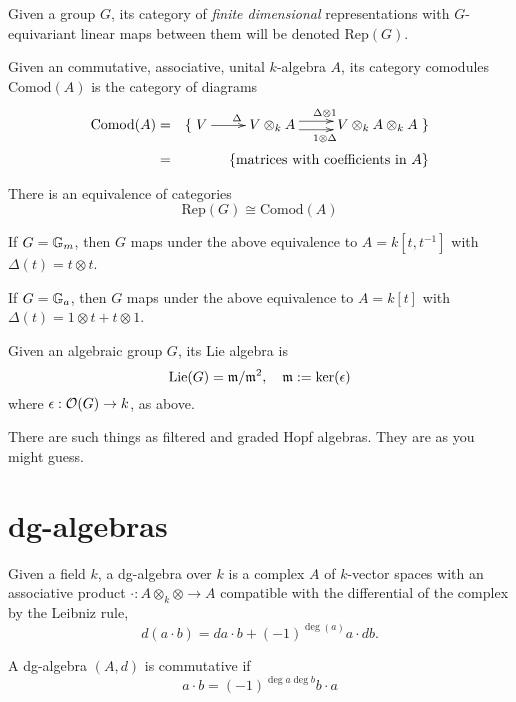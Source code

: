 \begin{defn}
Given a group $G$, its category of \emph{finite dimensional} representations with $G$-equivariant linear maps between them will be denoted $\mathrm{Rep}(G)$.
\end{defn}
\begin{defn}
Given an commutative, associative, unital $k$-algebra $A$, its category comodules $\mathrm{Comod}(A)$ is the category of diagrams
\begin{eqnarray*}
\mathrm{Comod}(A) & = & \{ \xymatrix{
V \ar[r]^{\Delta} & V \otimes_k A \ar@<0.3em>[r]^{\Delta \otimes 1} \ar@<-0.3em>[r]_{1 \otimes \Delta} & V \otimes_k A \otimes_k A
} \} \\
& = & \{ \textrm{matrices with coefficients in $A$} \}
\end{eqnarray*}
\end{defn}
There is an equivalence of categories
\[
\mathrm{Rep}(G) \cong \mathrm{Comod}(A)
\]
\begin{exam}
If $G = \mathbb{G}_m$, then $G$ maps under the above equivalence to $A = k[t,t^{-1}]$ with $\Delta(t) = t \otimes t$.
\end{exam}
\begin{exam}
If $G = \mathbb{G}_a$, then $G$ maps under the above equivalence to $A = k[t]$ with $\Delta(t) = 1 \otimes t + t \otimes 1$.
\end{exam}
\begin{defn}
Given an algebraic group $G$, its Lie algebra is
\[
\mathrm{Lie}(G) = \mathfrak{m} / \mathfrak{m}^2, \quad \mathfrak{m} := \ker(\epsilon)
\]
where $\epsilon : \mathcal{O}(G) \to k$, as above.
\end{defn}
\begin{rem}
There are such things as filtered and graded Hopf algebras. They are as you might guess.
\end{rem}

\section{dg-algebras}
\begin{defn}[dg-algebra]\label{def:dgalgebra}
Given a field $k$, a dg-algebra over $k$ is a complex $A$ of $k$-vector spaces with an associative product $\cdot : A \otimes_k \otimes \to A$ compatible with the differential of the complex by the Leibniz rule,
\[
d(a \cdot b) = da \cdot b + (-1)^{\deg(a)} a \cdot db.
\]
\end{defn}
\begin{defn}
A dg-algebra $(A, d)$ is commutative if
\[
a \cdot b = (-1)^{\deg a \deg b} b \cdot a
\]
\end{defn}

